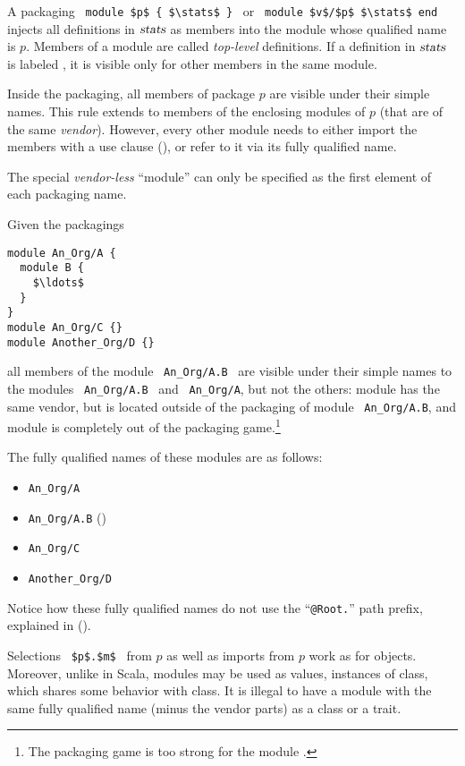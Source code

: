 A packaging ~\lstinline!module $p$ { $\stats$ }!~ or ~\lstinline!module $v$/$p$ $\stats$ end!~ injects all definitions in $\mbox{\sl stats}$ as members into the module whose qualified name is $p$. Members of a module are called {\em top-level} definitions. If a definition in $\mbox{\sl stats}$ is labeled , it is visible only for other members in the same module. 

Inside the packaging, all members of package $p$ are visible under their simple names. This rule extends to members of the enclosing modules of $p$ (that are of the same {\em vendor}). However, every other module needs to either import the members with a use clause (), or refer to it via its fully qualified name. 

The special {\em vendor-less}  ``module'' can only be specified as the first element of each packaging name. 

\example Given the packagings
\begin{lstlisting}
module An_Org/A {
  module B {
    $\ldots$
  }
}
module An_Org/C {}
module Another_Org/D {}
\end{lstlisting}
all members of the module ~\lstinline!An_Org/A.B!~ are visible under their simple names to the modules ~\lstinline!An_Org/A.B!~ and ~\lstinline!An_Org/A!, but not the others: module  has the same vendor, but is located outside of the packaging of module ~\lstinline!An_Org/A.B!, and module  is completely out of the packaging game.\footnote{The packaging game is too strong for the module .} 

The fully qualified names of these modules are as follows: 
\begin{itemize}
\item \lstinline!An_Org/A!
\item \lstinline!An_Org/A.B! ()
\item \lstinline!An_Org/C!
\item \lstinline!Another_Org/D!
\end{itemize}

Notice how these fully qualified names do not use the ``\lstinline!@Root.!'' path prefix, explained in ().

Selections ~\lstinline!$p$.$m$!~ from $p$ as well as imports from $p$ work as for objects. Moreover, unlike in Scala, modules may be used as values, instances of  class, which shares some behavior with  class. It is illegal to have a module with the same fully qualified name (minus the vendor parts) as a class or a trait. 

